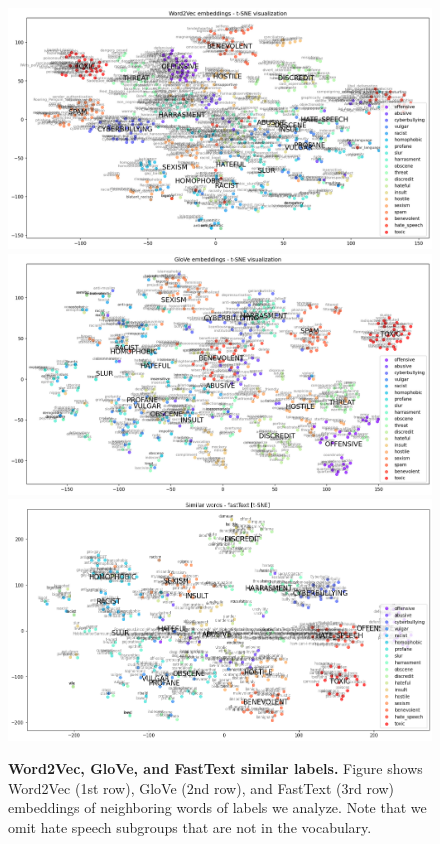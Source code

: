 \documentclass[fleqn,moreauthors,10pt]{ds_report}
\begin{document}
\begin{figure}[!t]
	\centering
	\includegraphics[width=\linewidth]{SimilarWords - word2vec - t-SNE_1.png}
	\includegraphics[width=\linewidth]{SimilarWords - Glove - t-SNE_1.png}
	\includegraphics[width=\linewidth]{SimilarWords - FastText - t-SNE_1.png}
	\caption{\textbf{Word2Vec, GloVe, and FastText similar labels.} Figure shows Word2Vec (1st row), GloVe (2nd row), and FastText (3rd row) embeddings of neighboring words of labels we analyze. Note that we omit hate speech subgroups that are not in the vocabulary.}
	\label{fig:embedding_labels}
\end{figure}
\end{document}
